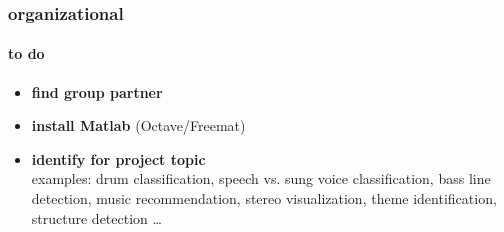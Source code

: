         \begin{frame}\frametitle{organizational}\framesubtitle{to do}
            \begin{itemize}
                \item   \textbf{find group partner}
            
                \smallskip
                \item<2->   \textbf{install Matlab} (Octave/Freemat)
            
                \smallskip
                \item<3->   \textbf{identify for project topic}\\ examples: drum classification, speech vs. sung voice classification, bass line detection, music recommendation, stereo visualization, theme identification, structure detection \ldots
            \end{itemize}
        \end{frame}




